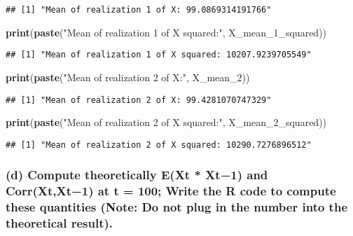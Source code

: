 \documentclass[
]{article}
\newenvironment{Shaded}{\begin{snugshade}}{\end{snugshade}}
\newcommand{\FunctionTok}[1]{\textcolor[rgb]{0.13,0.29,0.53}{\textbf{#1}}}
\newcommand{\NormalTok}[1]{#1}
\newcommand{\StringTok}[1]{\textcolor[rgb]{0.31,0.60,0.02}{#1}}
\begin{document}
\begin{verbatim}
## [1] "Mean of realization 1 of X: 99.0869314191766"
\end{verbatim}

\begin{Shaded}
\begin{Highlighting}[]
\FunctionTok{print}\NormalTok{(}\FunctionTok{paste}\NormalTok{(}\StringTok{"Mean of realization 1 of X squared:"}\NormalTok{, X\_mean\_1\_squared))}
\end{Highlighting}
\end{Shaded}

\begin{verbatim}
## [1] "Mean of realization 1 of X squared: 10207.9239705549"
\end{verbatim}

\begin{Shaded}
\begin{Highlighting}[]
\FunctionTok{print}\NormalTok{(}\FunctionTok{paste}\NormalTok{(}\StringTok{"Mean of realization 2 of X:"}\NormalTok{, X\_mean\_2))}
\end{Highlighting}
\end{Shaded}

\begin{verbatim}
## [1] "Mean of realization 2 of X: 99.4281070747329"
\end{verbatim}

\begin{Shaded}
\begin{Highlighting}[]
\FunctionTok{print}\NormalTok{(}\FunctionTok{paste}\NormalTok{(}\StringTok{"Mean of realization 2 of X squared:"}\NormalTok{, X\_mean\_2\_squared))}
\end{Highlighting}
\end{Shaded}

\begin{verbatim}
## [1] "Mean of realization 2 of X squared: 10290.7276896512"
\end{verbatim}

\hypertarget{d-compute-theoretically-ext-xt1-and-corrxtxt1-at-t-100-write-the-r-code-to-compute-these-quantities-note-do-not-plug-in-the-number-into-the-theoretical-result.}{%
\subsubsection{(d) Compute theoretically E(Xt * Xt−1) and Corr(Xt,Xt−1)
at t = 100; Write the R code to compute these quantities (Note: Do not
plug in the number into the theoretical
result).}\label{d-compute-theoretically-ext-xt1-and-corrxtxt1-at-t-100-write-the-r-code-to-compute-these-quantities-note-do-not-plug-in-the-number-into-the-theoretical-result.}}
\end{document}
